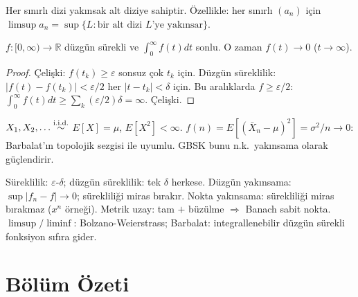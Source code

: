 \begin{teorem}\label{thm:bolzano}
Her sınırlı dizi yakınsak alt diziye sahiptir. Özellikle: her sınırlı $(a_n)$ için $\limsup a_n=\sup\{L:\text{bir alt dizi }L\text{'ye yakınsar}\}$.
\end{teorem}

\begin{teorem}\label{thm:barbalat}
$f:[0,\infty)\to\mathbb{R}$ düzgün sürekli ve $\int_0^\infty f(t)dt$ sonlu. O zaman $f(t)\to0$ ($t\to\infty$).
\end{teorem}

\begin{proof}
Çelişki: $f(t_k)\geq\varepsilon$ sonsuz çok $t_k$ için. Düzgün süreklilik: $|f(t)-f(t_k)|<\varepsilon/2$ her $|t-t_k|<\delta$ için. Bu aralıklarda $f\geq\varepsilon/2$: $\int_0^\infty f(t)dt\geq\sum_k(\varepsilon/2)\delta=\infty$. Çelişki.
\end{proof}

\begin{ornek}\label{ex:barbalat_gbsk}
$X_1,X_2,\ldots\overset{\text{i.i.d.}}{\sim}$ $E[X]=\mu$, $E[X^2]<\infty$. $f(n)=E[(\bar X_n-\mu)^2]=\sigma^2/n\to0$: Barbalat'ın topolojik sezgisi ile uyumlu. GBSK bunu n.k.\ yakınsama olarak güçlendirir.
\end{ornek}

\begin{mikroozet}
Süreklilik: $\varepsilon$-$\delta$; düzgün süreklilik: tek $\delta$ herkese.
Düzgün yakınsama: $\sup|f_n - f| \to 0$; sürekliliği miras bırakır.
Nokta yakınsama: sürekliliği miras bırakmaz ($x^n$ örneği).
Metrik uzay: tam $+$ büzülme $\Rightarrow$ Banach sabit nokta.
$\limsup/\liminf$: Bolzano-Weierstrass; Barbalat: integrallenebilir düzgün sürekli fonksiyon sıfıra gider.
\end{mikroozet}

\section*{Bölüm Özeti}


